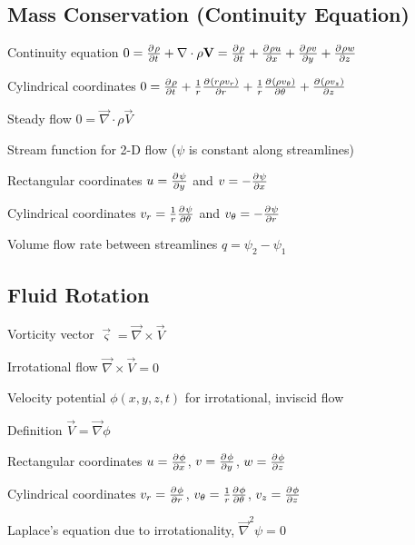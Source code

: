 \documentclass{article}
\begin{document}
\subsection{Mass Conservation (Continuity Equation)}
\begin{description*}
\item[Continuity equation]
  \(0 = \pd{\rho}{t} + \vec\nabla\cdot\rho\vec{V}
  = \pd{\rho}{t}+\pd{\rho u}{x}+\pd{\rho v}{y}+\pd{\rho w}{z}\)
\item[Cylindrical coordinates]
  \(0 = \pd{\rho}{t} + \frac{1}{r}\pd{(r\rho v_r)}{r}
  + \frac{1}{r}\pd{(\rho v_\theta)}{\theta} + \pd{(\rho v_z)}{z}\)
\item[Steady flow]
  \(0 = \vec\nabla\cdot\rho\vec{V}\)
\item[Stream function for 2-D flow ($\psi$ is constant along streamlines)]~
  \begin{description*}
  \item[Rectangular coordinates]
    \(u = \pd{\psi}{y}\) and \(v = -\pd{\psi}{x}\)
  \item[Cylindrical coordinates]
    \(v_r = \frac{1}{r}\pd{\psi}{\theta}\) and \(v_\theta = -\pd{\psi}{r}\)
  \item[Volume flow rate between streamlines]
    \(q = \psi_2 - \psi_1\)
  \end{description*}
\end{description*}

\subsection{Fluid Rotation}
\begin{description*}
\item[Vorticity vector]
  \(\vec\varsigma = \vec\nabla\times\vec{V}\)
\item[Irrotational flow]
  \(\vec\nabla\times\vec{V} = 0\)
\item[Velocity potential $\phi(x,y,z,t)$] for irrotational, inviscid flow
  \begin{description*}
  \item[Definition]
    \(\vec V = \vec{\nabla}\phi\)
  \item[Rectangular coordinates]
    \(u = \pd{\phi}{x}\),
    \(v = \pd{\phi}{y}\),
    \(w = \pd{\phi}{z}\)
  \item[Cylindrical coordinates]
    \(v_r = \pd{\phi}{r}\),
    \(v_\theta = \frac{1}{r}\pd{\phi}{\theta}\),
    \(v_z = \pd{\phi}{z}\)
  \item[Laplace's equation] due to irrotationality,
    \(\vec\nabla^2\psi = 0\)
  \end{description*}
\end{description*}
\end{document}
